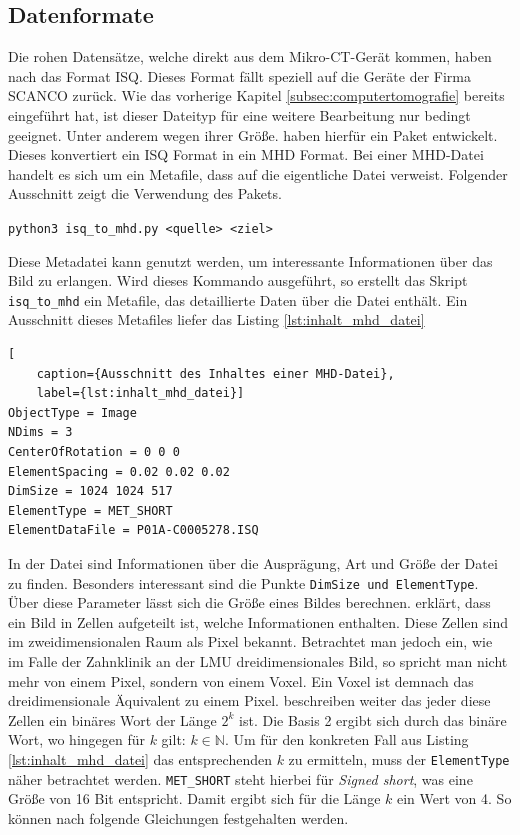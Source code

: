 \subsection{Datenformate}
\label{subsec:datensätze} Die rohen Datensätze, welche direkt aus dem Mikro-\ac{CT}-Gerät
kommen, haben nach \citet{scanco2024} das Format \ac{ISQ}. Dieses Format fällt speziell
auf die Geräte der Firma SCANCO zurück. Wie das vorherige Kapitel
\ref{subsec:computertomografie} bereits eingeführt hat, ist dieser Dateityp für eine
weitere Bearbeitung nur bedingt geeignet. Unter anderem wegen ihrer Größe. \citet[S.~118-119]{RoeschKunzelmann2018}
haben hierfür ein Paket entwickelt. Dieses konvertiert ein \ac{ISQ} Format in
ein \ac{MHD} Format. Bei einer \ac{MHD}-Datei handelt es sich um ein Metafile,
dass auf die eigentliche Datei verweist. Folgender Ausschnitt zeigt die Verwendung
des Pakets.
\begin{center}
	\texttt{python3 isq\_to\_mhd.py <quelle> <ziel>}
\end{center}
Diese Metadatei kann genutzt werden, um interessante Informationen über das Bild
zu erlangen. Wird dieses Kommando ausgeführt, so erstellt das Skript \texttt{isq\_to\_mhd}
ein Metafile, das detaillierte Daten über die Datei enthält. Ein Ausschnitt
dieses Metafiles liefer das Listing \ref{lst:inhalt_mhd_datei}

\begin{lstlisting}[
	caption={Ausschnitt des Inhaltes einer MHD-Datei},
	label={lst:inhalt_mhd_datei}]
ObjectType = Image
NDims = 3
CenterOfRotation = 0 0 0
ElementSpacing = 0.02 0.02 0.02
DimSize = 1024 1024 517
ElementType = MET_SHORT
ElementDataFile = P01A-C0005278.ISQ
\end{lstlisting}

In der Datei sind Informationen über die Ausprägung, Art und Größe der Datei zu finden.
Besonders interessant sind die Punkte \texttt{DimSize und ElementType}. Über
diese Parameter lässt sich die Größe eines Bildes berechnen. \citet[S.~10-11]{burger2009}
erklärt, dass ein Bild in Zellen aufgeteilt ist, welche Informationen enthalten.
Diese Zellen sind im zweidimensionalen Raum als Pixel bekannt. Betrachtet man
jedoch ein, wie im Falle der Zahnklinik an der \ac{LMU} dreidimensionales Bild, so
spricht man nicht mehr von einem Pixel, sondern von einem Voxel. Ein Voxel ist demnach
das dreidimensionale Äquivalent zu einem Pixel. \citet[S.~10-11]{burger2009} beschreiben
weiter das jeder diese Zellen ein binäres Wort der Länge $2^{k}$ ist. Die Basis
2 ergibt sich durch das binäre Wort, wo hingegen für $k$ gilt:
$k \in \mathbb{N}$. Um für den konkreten Fall aus Listing \ref{lst:inhalt_mhd_datei}
das entsprechenden $k$ zu ermitteln, muss der \texttt{ElementType} näher betrachtet
werden. \texttt{MET\_SHORT} steht hierbei für \textit{Signed short}, was eine Größe
von 16 Bit entspricht. Damit ergibt sich für die Länge $k$ ein Wert von 4. So
können nach \citet[S.~10-11]{burger2009} folgende Gleichungen festgehalten werden.

